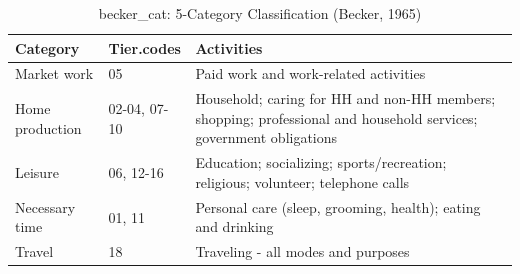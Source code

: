 \begin{table}[ht]
\centering
\begin{tabular}{lll}
  \hline
Category & Tier.codes & Activities \\ 
  \hline
Market work & 05 & Paid work and work-related activities \\ 
  Home production & 02-04, 07-10 & Household; caring for HH and non-HH members; shopping; professional and household services; government obligations \\ 
  Leisure & 06, 12-16 & Education; socializing; sports/recreation; religious; volunteer; telephone calls \\ 
  Necessary time & 01, 11 & Personal care (sleep, grooming, health); eating and drinking \\ 
  Travel & 18 & Traveling - all modes and purposes \\ 
   \hline
\end{tabular}
\caption{becker\_cat: 5-Category Classification (Becker, 1965)} 
\label{tab:becker_cat}
\end{table}
